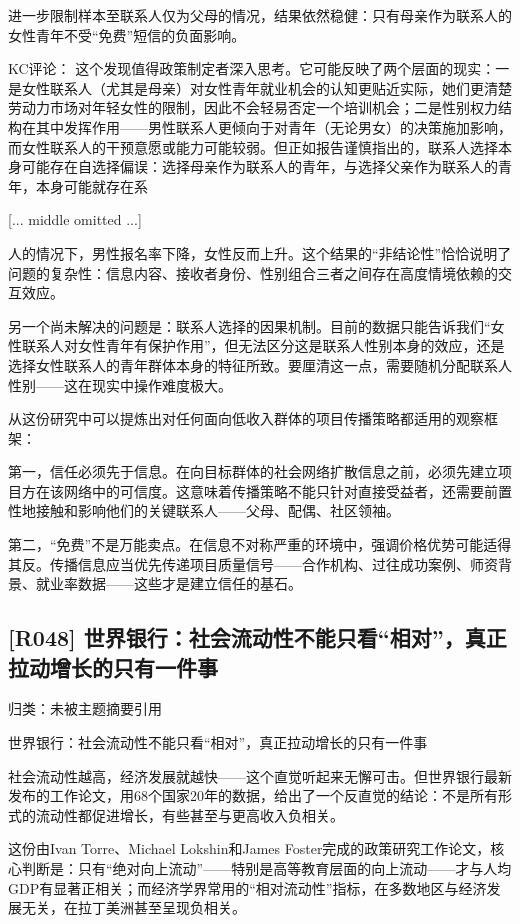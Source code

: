\documentclass[11pt]{ctexart}
\begin{document}
进一步限制样本至联系人仅为父母的情况，结果依然稳健：只有母亲作为联系人的女性青年不受“免费”短信的负面影响。

KC评论： 这个发现值得政策制定者深入思考。它可能反映了两个层面的现实：一是女性联系人（尤其是母亲）对女性青年就业机会的认知更贴近实际，她们更清楚劳动力市场对年轻女性的限制，因此不会轻易否定一个培训机会；二是性别权力结构在其中发挥作用——男性联系人更倾向于对青年（无论男女）的决策施加影响，而女性联系人的干预意愿或能力可能较弱。但正如报告谨慎指出的，联系人选择本身可能存在自选择偏误：选择母亲作为联系人的青年，与选择父亲作为联系人的青年，本身可能就存在系

[... middle omitted ...]

人的情况下，男性报名率下降，女性反而上升。这个结果的“非结论性”恰恰说明了问题的复杂性：信息内容、接收者身份、性别组合三者之间存在高度情境依赖的交互效应。

另一个尚未解决的问题是：联系人选择的因果机制。目前的数据只能告诉我们“女性联系人对女性青年有保护作用”，但无法区分这是联系人性别本身的效应，还是选择女性联系人的青年群体本身的特征所致。要厘清这一点，需要随机分配联系人性别——这在现实中操作难度极大。

从这份研究中可以提炼出对任何面向低收入群体的项目传播策略都适用的观察框架：

第一，信任必须先于信息。在向目标群体的社会网络扩散信息之前，必须先建立项目方在该网络中的可信度。这意味着传播策略不能只针对直接受益者，还需要前置性地接触和影响他们的关键联系人——父母、配偶、社区领袖。

第二，“免费”不是万能卖点。在信息不对称严重的环境中，强调价格优势可能适得其反。传播信息应当优先传递项目质量信号——合作机构、过往成功案例、师资背景、就业率数据——这些才是建立信任的基石。

\subsection{[R048] 世界银行：社会流动性不能只看“相对”，真正拉动增长的只有一件事}
{\small\color{refgray}归类：未被主题摘要引用}

世界银行：社会流动性不能只看“相对”，真正拉动增长的只有一件事

社会流动性越高，经济发展就越快——这个直觉听起来无懈可击。但世界银行最新发布的工作论文，用68个国家20年的数据，给出了一个反直觉的结论：不是所有形式的流动性都促进增长，有些甚至与更高收入负相关。

这份由Ivan Torre、Michael Lokshin和James Foster完成的政策研究工作论文，核心判断是：只有“绝对向上流动”——特别是高等教育层面的向上流动——才与人均GDP有显著正相关；而经济学界常用的“相对流动性”指标，在多数地区与经济发展无关，在拉丁美洲甚至呈现负相关。
\end{document}
